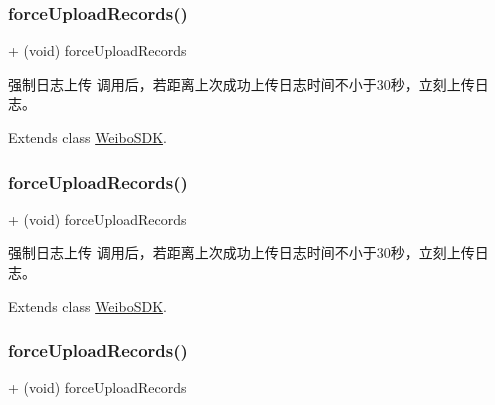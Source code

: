 \subsubsection{\texorpdfstring{force\+Upload\+Records()}{forceUploadRecords()}\hspace{0.1cm}{\footnotesize\ttfamily [1/3]}}
{\footnotesize\ttfamily + (void) force\+Upload\+Records \begin{DoxyParamCaption}{ }\end{DoxyParamCaption}}

强制日志上传 调用后，若距离上次成功上传日志时间不小于30秒，立刻上传日志。 

Extends class \mbox{\hyperlink{interface_weibo_s_d_k_ab5d6291270ebed0084a505e009bc15a2}{Weibo\+S\+DK}}.

\mbox{\label{category_weibo_s_d_k_07_statistics_08_ab5d6291270ebed0084a505e009bc15a2}} 
\subsubsection{\texorpdfstring{force\+Upload\+Records()}{forceUploadRecords()}\hspace{0.1cm}{\footnotesize\ttfamily [2/3]}}
{\footnotesize\ttfamily + (void) force\+Upload\+Records \begin{DoxyParamCaption}{ }\end{DoxyParamCaption}}

强制日志上传 调用后，若距离上次成功上传日志时间不小于30秒，立刻上传日志。 

Extends class \mbox{\hyperlink{interface_weibo_s_d_k_ab5d6291270ebed0084a505e009bc15a2}{Weibo\+S\+DK}}.

\mbox{\label{category_weibo_s_d_k_07_statistics_08_ab5d6291270ebed0084a505e009bc15a2}} 
\subsubsection{\texorpdfstring{force\+Upload\+Records()}{forceUploadRecords()}\hspace{0.1cm}{\footnotesize\ttfamily [3/3]}}
{\footnotesize\ttfamily + (void) force\+Upload\+Records \begin{DoxyParamCaption}{ }\end{DoxyParamCaption}}

